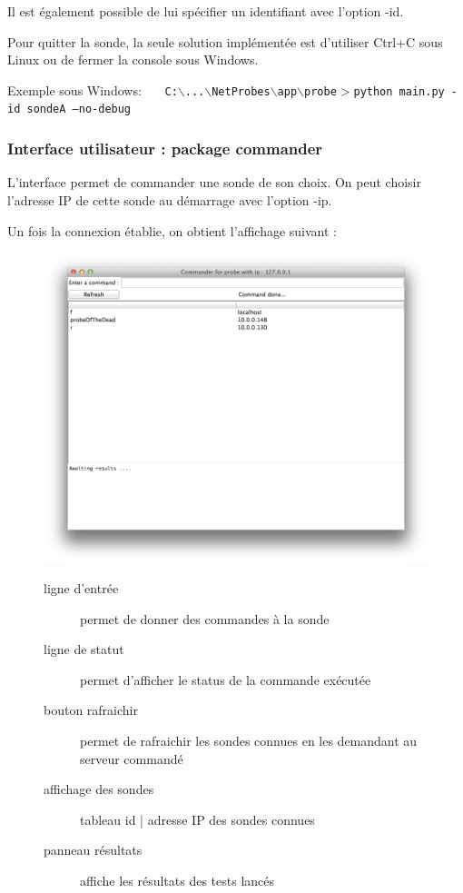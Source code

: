 \documentclass[a4paper,11pt]{article}
\begin{document}
Il est également possible de lui spécifier un identifiant avec l'option -id.

Pour quitter la sonde, la seule solution implémentée est d'utiliser Ctrl+C sous Linux ou de fermer la console sous Windows.

Exemple sous Windows: \ \ \ \texttt{C:$\backslash$...$\backslash$NetProbes$\backslash$app$\backslash$probe$>$python main.py -id sondeA --no-debug}

\subsubsection{Interface utilisateur : package commander}
L'interface permet de commander une sonde de son choix. On peut choisir l'adresse IP de cette sonde au démarrage avec l'option -ip.

Un fois la connexion établie, on obtient l'affichage suivant :
\begin{figure}
\begin{minipage}[c]{0.5\linewidth}
\centering\includegraphics[width=\linewidth]{img/commander.png}
\end{minipage}
\hfill
\begin{minipage}[c]{0.5\linewidth}
\begin{description}
\item[ligne d'entrée] permet de donner des commandes à la sonde
\item[ligne de statut] permet d'afficher le status de la commande exécutée
\item[bouton rafraichir] permet de rafraichir les sondes connues en les demandant au serveur commandé
\item[affichage des sondes] tableau id | adresse IP des sondes connues
\item[panneau résultats] affiche les résultats des tests lancés
\end{description}
\end{minipage}
\end{figure}
\end{document}
